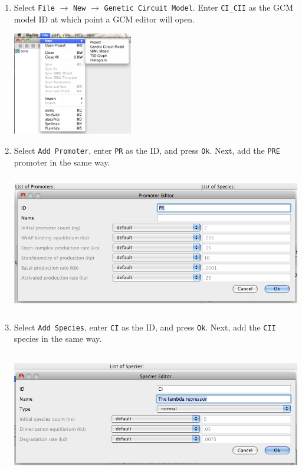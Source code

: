 \documentclass[titlepage,11pt]{article}
\begin{document}
\begin{enumerate}
\item Select {\tt File} $\rightarrow$ {\tt New} $\rightarrow$ 
      {\tt Genetic Circuit Model}.
      Enter {\tt CI\_CII} as the GCM model ID at which point a GCM
      editor will open.

\includegraphics[height=45mm]{screenshots/newModel}

\item Select {\tt Add Promoter}, enter {\tt PR} as the ID, and press
  {\tt Ok}.  Next, add the {\tt PRE} promoter in the same way.

\includegraphics[height=60mm]{screenshots/promoter}

\item Select {\tt Add Species}, enter {\tt CI} as the ID, and press
  {\tt Ok}.  Next, add the {\tt CII} species in the same way.

\includegraphics[height=55mm]{screenshots/GCMspecies}


\end{enumerate}
\end{document}
